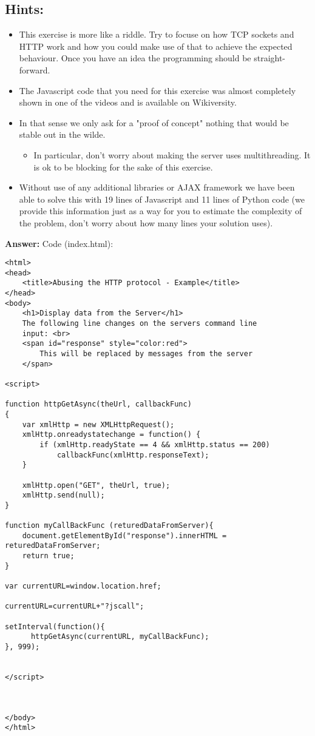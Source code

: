 \documentclass{WeSTassignment}
\begin{document}
\subsection{Hints:}
\begin{itemize}
\item This exercise is more like a riddle. Try to focuse on how TCP sockets and HTTP work and how you could make use of that to achieve the expected behaviour. Once you have an idea the programming should be straight-forward. 
\item The Javascript code that you need for this exercise was almost completely shown in one of the videos and is available on Wikiversity.
\item In that sense we only ask for a "proof of concept" nothing that would be stable out in the wilde.
  \begin{itemize}
  	\item In particular, don't worry about making the server uses multithreading. It is ok to be blocking for the sake of this exercise.
  \end{itemize}
\item Without use of any additional libraries or AJAX framework we have been able to solve this with 19 lines of Javascript and 11 lines of Python code (we provide this information just as a way for you to estimate the complexity of the problem, don't worry about how many lines your solution uses).
\end{itemize}

\textbf{Answer:} 
Code (index.html): \\ 
\begin{lstlisting}
<html>
<head>
	<title>Abusing the HTTP protocol - Example</title>
</head>
<body>
	<h1>Display data from the Server</h1>
	The following line changes on the servers command line
	input: <br>
	<span id="response" style="color:red">
		This will be replaced by messages from the server
	</span>

<script>

function httpGetAsync(theUrl, callbackFunc)
{
    var xmlHttp = new XMLHttpRequest();
    xmlHttp.onreadystatechange = function() {
        if (xmlHttp.readyState == 4 && xmlHttp.status == 200)
            callbackFunc(xmlHttp.responseText);
    }

    xmlHttp.open("GET", theUrl, true);
    xmlHttp.send(null);
}

function myCallBackFunc (returedDataFromServer){
	document.getElementById("response").innerHTML = returedDataFromServer;
	return true;
}

var currentURL=window.location.href;

currentURL=currentURL+"?jscall";

setInterval(function(){	
	  httpGetAsync(currentURL, myCallBackFunc);
}, 999);


</script>



</body>
</html>

\end{lstlisting}
\end{document}
